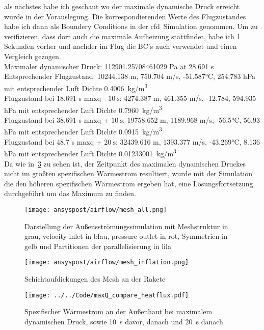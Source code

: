 als nächstes habe ich geschaut wo der maximale dynamische Druck erreicht wurde in der Vorauslegung. Die korrespondierenden Werte des Flugzustandes
habe ich dann als Boundery Conditions in der \ac{cfd}~Simulation genommen.
Um zu verifizieren, dass dort auch die maximale Aufheizung stattfindet, habe ich 1 Sekunden vorher und nachder
im Flug die BC's auch verwendet und einen Vergleich gezogen.\\
Maximaler dynamischer Druck: 112901.25708461029 Pa at 28.691 s\\
Entsprechender Flugzustand: 10244.138 m, 750.704 m/s, -51.587°C, 254.783 hPa mit entsprechender Luft Dichte \SI{0.4006}{kg/m^3}\\
Flugzustand bei 18.691 s \ac{maxq} - $\SI{10}{\second}$: 4274.387 m, 461.355 m/s, -12.784, 594.935 hPa mit entsprechender Luft Dichte \SI{0.7960}{kg/m^3}\\
Flugzustand bei 38.691 s \ac{maxq} + $\SI{10}{\second}$: 19758.652 m, 1189.968 m/s, -56.5°C, 56.93 hPa mit entsprechender Luft Dichte \SI{0.0915}{kg/m^3}\\
Flugzustand bei 48.7 s \ac{maxq} + $\SI{20}{\second}$: 32439.616 m, 1393.377 m/s, -43.269°C, 8.136 hPa mit entsprechender Luft Dichte \SI{0.01233001}{kg/m^3}\\
Da wie in~\ref{fig:spezifischer_waermestrom_maxQ_simulationen} zu sehen ist, der Zeitpunkt des maximalen dynamischen Druckes nicht im größten spezifischen
Wärmestrom resultiert, wurde mit der Simulation die den höheren spezifischen Wärmestrom ergeben hat, eine Lösungsfortsetzung durchgeführt um das Maximum zu finden.\\

\begin{figure}[H]
  \centering
  \texttt{[image: ansyspost/airflow/mesh\_all.png]}
  \caption{Darstellung der Außensströmungssimulation mit Meshstruktur in grau, velocity inlet in blau, pressure outlet in rot, Symmetrien in gelb und Partitionen der parallelisierung in lila}\label{fig:aussenstroemung_mesh}
\end{figure}

\begin{figure}[H]
  \centering
  \texttt{[image: ansyspost/airflow/mesh\_inflation.png]}
  \caption{Schichtaufdickungen des Mesh an der Rakete}\label{fig:aussenstroemung_mesh_inflationlayers}
\end{figure}

\begin{figure}[H]
  \centering
  \texttt{[image: ../../Code/maxQ\_compare\_heatflux.pdf]}
  \caption{Spezifischer Wärmestrom an der Außenhaut bei maximalem dynamischen Druck, sowie \SI{10}{s} davor, danach und \SI{20}{s} danach}\label{fig:spezifischer_waermestrom_maxQ_simulationen}
\end{figure}

